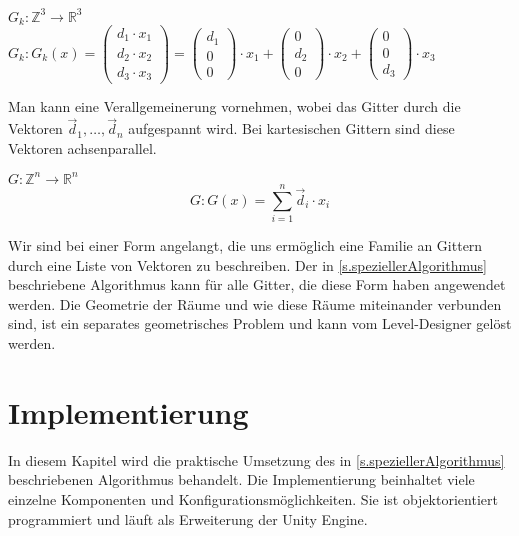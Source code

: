 $ G_k: \mathbb{Z}^3 \rightarrow \mathbb{R}^3 $ \\
$ G_k: G_k(x) = \left(\begin{array}{c} d_1 \cdot x_1 \\ d_2 \cdot x_2 \\ d_3 \cdot x_3 \end{array}\right) = 
\left(\begin{array}{c} d_1 \\ 0 \\ 0 \end{array}\right) \cdot x_1 +
\left(\begin{array}{c} 0 \\ d_2 \\ 0 \end{array}\right) \cdot x_2 +
\left(\begin{array}{c} 0 \\ 0 \\ d_3 \end{array}\right) \cdot x_3 
$



Man kann eine Verallgemeinerung vornehmen, wobei das Gitter durch die Vektoren $ \vec{d}_1, \dots , \vec{d}_n $ aufgespannt wird. Bei kartesischen Gittern sind diese Vektoren achsenparallel.

$ G: \mathbb{Z}^n \rightarrow \mathbb{R}^n $ \\
\[ G: G(x) = \sum_{i=1}^{n} \vec{d}_i \cdot x_i \]

Wir sind bei einer Form angelangt, die uns ermöglich eine Familie an Gittern durch eine Liste von Vektoren zu beschreiben. Der in \ref{s.speziellerAlgorithmus} beschriebene Algorithmus kann für alle Gitter, die diese Form haben angewendet werden. Die Geometrie der Räume und wie diese Räume miteinander verbunden sind, ist ein separates geometrisches Problem und kann vom Level-Designer gelöst werden.

\chapter{Implementierung}\label{c.implementierung}

In diesem Kapitel wird die praktische Umsetzung des in \ref{s.speziellerAlgorithmus} beschriebenen Algorithmus behandelt. Die Implementierung beinhaltet viele einzelne Komponenten und Konfigurationsmöglichkeiten. Sie ist objektorientiert programmiert und läuft als Erweiterung der Unity Engine. 

